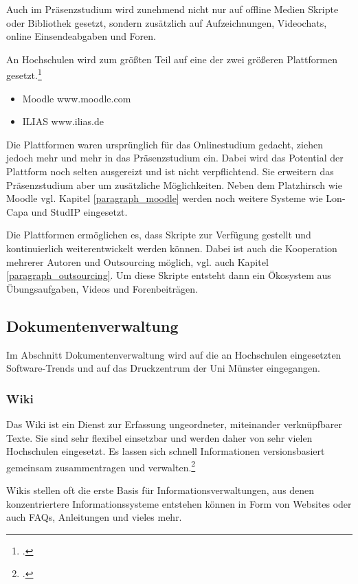 Auch im Präsenzstudium wird zunehmend nicht nur auf offline Medien Skripte oder Bibliothek gesetzt, sondern zusätzlich auf Aufzeichnungen, Videochats, online Einsendeabgaben und Foren.

An Hochschulen wird zum gr\"oßten Teil auf eine der zwei größeren Plattformen gesetzt.\footcite{oevel_lange_2008}

\begin{itemize}
	\item Moodle www.moodle.com
	\item ILIAS www.ilias.de
\end{itemize}

Die Plattformen waren ursprünglich für das Onlinestudium gedacht, ziehen jedoch mehr und mehr in das Präsenzstudium ein. Dabei wird das Potential der Plattform noch selten ausgereizt und ist nicht verpflichtend. Sie erweitern das Präsenzstudium aber um zusätzliche Möglichkeiten.
Neben dem Platzhirsch wie Moodle vgl. Kapitel \ref{paragraph_moodle} werden noch weitere Systeme wie Lon-Capa und StudIP eingesetzt.

Die Plattformen ermöglichen es, dass Skripte zur Verfügung gestellt und kontinuierlich weiterentwickelt werden können. Dabei ist auch die Kooperation mehrerer Autoren und Outsourcing möglich, vgl. auch Kapitel \ref{paragraph_outsourcing}. Um diese Skripte entsteht dann ein Ökosystem aus Übungsaufgaben, Videos und Forenbeiträgen.



\subsection{Dokumentenverwaltung}
\label{dokumentenverwaltungssysteme}
Im Abschnitt Dokumentenverwaltung wird auf die an Hochschulen eingesetzten Software-Trends und auf das Druckzentrum der Uni Münster eingegangen.


\subsubsection{Wiki}
Das Wiki ist ein Dienst zur Erfassung ungeordneter, miteinander verknüpfbarer Texte. Sie sind sehr flexibel einsetzbar und werden daher von sehr vielen Hochschulen eingesetzt. Es lassen sich schnell Informationen versionsbasiert gemeinsam zusammentragen und verwalten.\footcite[Vgl.][65]{schmidtjh_2013}

Wikis stellen oft die erste Basis für Informationsverwaltungen, aus denen konzentriertere Informationssysteme entstehen können in Form von Websites oder auch FAQs, Anleitungen und vieles mehr.


